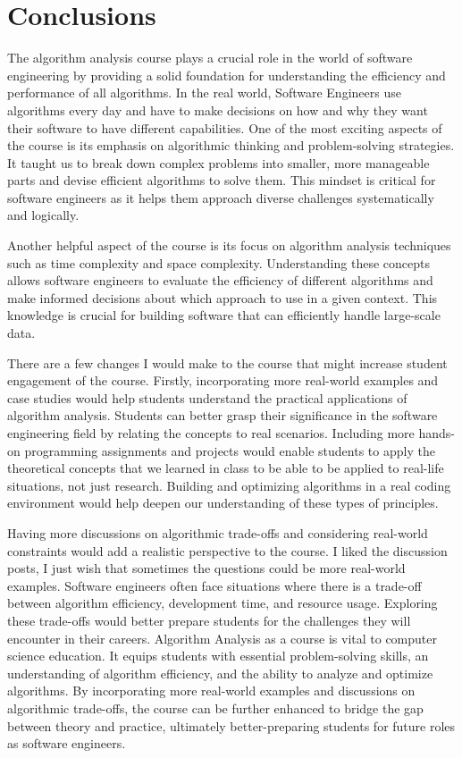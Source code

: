 \documentclass{article}
\theoremstyle{theorem}
\theoremstyle{definition}
\theoremstyle{remark}
\begin{document}
\section{Conclusions}\label{conclusions}

\medskip\indent
The algorithm analysis course plays a crucial role in the world of software engineering by providing a solid foundation for understanding the efficiency and performance of all algorithms. In the real world, Software Engineers use algorithms every day and have to make decisions on how and why they want their software to have different capabilities. One of the most exciting aspects of the course is its emphasis on algorithmic thinking and problem-solving strategies. It taught us to break down complex problems into smaller, more manageable parts and devise efficient algorithms to solve them. This mindset is critical for software engineers as it helps them approach diverse challenges systematically and logically.

\medskip\indent
Another helpful aspect of the course is its focus on algorithm analysis techniques such as time complexity and space complexity. Understanding these concepts allows software engineers to evaluate the efficiency of different algorithms and make informed decisions about which approach to use in a given context. This knowledge is crucial for building software that can efficiently handle large-scale data.

\medskip\indent
There are a few changes I would make to the course that might increase student engagement of the course. Firstly, incorporating more real-world examples and case studies would help students understand the practical applications of algorithm analysis. Students can better grasp their significance in the software engineering field by relating the concepts to real scenarios. Including more hands-on programming assignments and projects would enable students to apply the theoretical concepts that we learned in class to be able to be applied to real-life situations, not just research. Building and optimizing algorithms in a real coding environment would help deepen our understanding of these types of principles.

\medskip\indent
Having more discussions on algorithmic trade-offs and considering real-world constraints would add a realistic perspective to the course. I liked the discussion posts, I just wish that sometimes the questions could be more real-world examples. Software engineers often face situations where there is a trade-off between algorithm efficiency, development time, and resource usage. Exploring these trade-offs would better prepare students for the challenges they will encounter in their careers. Algorithm Analysis as a course is vital to computer science education. It equips students with essential problem-solving skills, an understanding of algorithm efficiency, and the ability to analyze and optimize algorithms. By incorporating more real-world examples and discussions on algorithmic trade-offs, the course can be further enhanced to bridge the gap between theory and practice, ultimately better-preparing students for future roles as software engineers.
\end{document}
